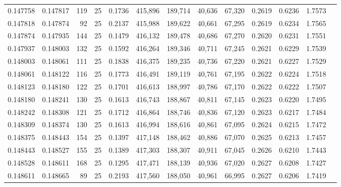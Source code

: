 \begin{tabular}{rrrrrrrrrrrrr}
0.147758 & 0.147817 &   119 &  25 &                                     0.1736 & 415,896 & 189,714 &  40,636 &  67,320 & 0.2619 & 0.6236 & 1.7573 \\
0.147818 & 0.147874 &    92 &  25 &                                     0.2137 & 415,988 & 189,622 &  40,661 &  67,295 & 0.2619 & 0.6234 & 1.7565 \\
0.147874 & 0.147935 &   144 &  25 &                                     0.1479 & 416,132 & 189,478 &  40,686 &  67,270 & 0.2620 & 0.6231 & 1.7551 \\
0.147937 & 0.148003 &   132 &  25 &                                     0.1592 & 416,264 & 189,346 &  40,711 &  67,245 & 0.2621 & 0.6229 & 1.7539 \\
0.148003 & 0.148061 &   111 &  25 &                                     0.1838 & 416,375 & 189,235 &  40,736 &  67,220 & 0.2621 & 0.6227 & 1.7529 \\
0.148061 & 0.148122 &   116 &  25 &                                     0.1773 & 416,491 & 189,119 &  40,761 &  67,195 & 0.2622 & 0.6224 & 1.7518 \\
0.148123 & 0.148180 &   122 &  25 &                                     0.1701 & 416,613 & 188,997 &  40,786 &  67,170 & 0.2622 & 0.6222 & 1.7507 \\
0.148180 & 0.148241 &   130 &  25 &                                     0.1613 & 416,743 & 188,867 &  40,811 &  67,145 & 0.2623 & 0.6220 & 1.7495 \\
0.148242 & 0.148308 &   121 &  25 &                                     0.1712 & 416,864 & 188,746 &  40,836 &  67,120 & 0.2623 & 0.6217 & 1.7484 \\
0.148309 & 0.148374 &   130 &  25 &                                     0.1613 & 416,994 & 188,616 &  40,861 &  67,095 & 0.2624 & 0.6215 & 1.7472 \\
0.148375 & 0.148443 &   154 &  25 &                                     0.1397 & 417,148 & 188,462 &  40,886 &  67,070 & 0.2625 & 0.6213 & 1.7457 \\
0.148443 & 0.148527 &   155 &  25 &                                     0.1389 & 417,303 & 188,307 &  40,911 &  67,045 & 0.2626 & 0.6210 & 1.7443 \\
0.148528 & 0.148611 &   168 &  25 &                                     0.1295 & 417,471 & 188,139 &  40,936 &  67,020 & 0.2627 & 0.6208 & 1.7427 \\
0.148611 & 0.148665 &    89 &  25 &                                     0.2193 & 417,560 & 188,050 &  40,961 &  66,995 & 0.2627 & 0.6206 & 1.7419 \\

\end{tabular}
